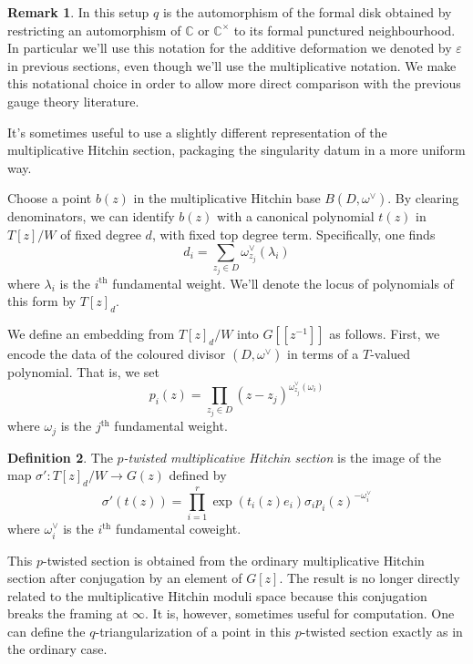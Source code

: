 \documentclass[11pt, oneside, reqno]{amsart}
\theoremstyle{definition} \newtheorem{definition}{Definition}[section]
\theoremstyle{definition} \newtheorem{remark}[definition]{Remark}
\theoremstyle{definition} \newtheorem{remarks}[definition]{Remarks}
\theoremstyle{definition} \newtheorem{question}[definition]{Question}
\theoremstyle{definition} \newtheorem*{note}{Note}
\theoremstyle{definition} \newtheorem{example}[definition]{Example}
\theoremstyle{definition} \newtheorem{examples}[definition]{Examples}
\newcommand{\CC}{\mathbb{C}}
\newcommand{\eps}{\varepsilon}
\begin{document}
\begin{remark}
In this setup $q$ is the automorphism of the formal disk obtained by restricting an automorphism of $\CC$ or $\CC^\times$ to its formal punctured neighbourhood.  In particular we'll use this notation for the additive deformation we denoted by $\eps$ in previous sections, even though we'll use the multiplicative notation.  We make this notational choice in order to allow more direct comparison with the previous gauge theory literature.
\end{remark}

It's sometimes useful to use a slightly different representation of the multiplicative Hitchin section, packaging the singularity datum in a more uniform way. 

Choose a point $b(z)$ in the multiplicative Hitchin base $B(D,\omega^\vee)$. By clearing denominators, we can identify $b(z)$ with a canonical polynomial $t(z)$ in $T[z]/W$ of fixed degree $d$, with fixed top degree term.  Specifically, one finds
\[d_i = \sum_{z_j \in D} \omega^\vee_{z_j}(\lambda_i)\]
where $\lambda_i$ is the $i^\text{th}$ fundamental weight.  We'll denote the locus of polynomials of this form by $T[z]_d$.

We define an embedding from $T[z]_d/W$ into $G[[z^{-1}]]$ as follows.  First, we encode the data of the coloured divisor $(D, \omega^\vee)$ in terms of a $T$-valued polynomial.  That is, we set 
\[p_i(z) = \prod_{z_j \in D} (z-z_j)^{\omega^\vee_{z_j}(\omega_i)}\]
where $\omega_j$ is the $j^{\text{th}}$ fundamental weight.

\begin{definition}
The \emph{$p$-twisted multiplicative Hitchin section} is the image of the map $\sigma' \colon T[z]_d/W \to G(z)$ defined by
\begin{equation}
\label{eq:steinberg}
\sigma'(t(z)) = \prod_{i=1}^r \exp\left(t_{i}(z) e_i\right) \sigma_i p_i(z)^{-\omega^\vee_i}
\end{equation}
where $\omega^\vee_i$ is the $i^\text{th}$ fundamental coweight.
\end{definition}

This $p$-twisted section is obtained from the ordinary multiplicative Hitchin section after conjugation by an element of $G[z]$.  The result is no longer directly related to the multiplicative Hitchin moduli space because this conjugation breaks the framing at $\infty$.  It is, however, sometimes useful for computation. One can define the $q$-triangularization of a point in this $p$-twisted section exactly as in the ordinary case.
\end{document}

